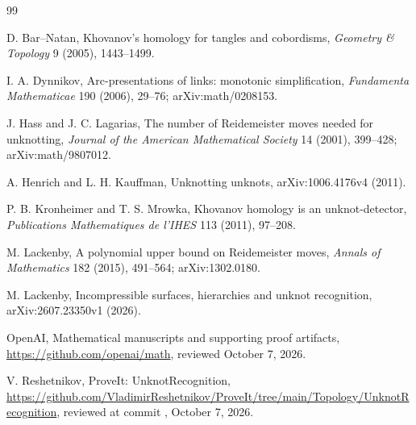 \begin{thebibliography}{99}

D. Bar--Natan,
\newblock Khovanov's homology for tangles and cobordisms,
\newblock \emph{Geometry \& Topology} 9 (2005), 1443--1499.

I. A. Dynnikov,
\newblock Arc-presentations of links: monotonic simplification,
\newblock \emph{Fundamenta Mathematicae} 190 (2006), 29--76;
\newblock arXiv:math/0208153.

J. Hass and J. C. Lagarias,
\newblock The number of Reidemeister moves needed for unknotting,
\newblock \emph{Journal of the American Mathematical Society} 14 (2001),
399--428;
\newblock arXiv:math/9807012.

A. Henrich and L. H. Kauffman,
\newblock Unknotting unknots,
\newblock arXiv:1006.4176v4 (2011).

P. B. Kronheimer and T. S. Mrowka,
\newblock Khovanov homology is an unknot-detector,
\newblock \emph{Publications Mathematiques de l'IHES} 113 (2011), 97--208.

M. Lackenby,
\newblock A polynomial upper bound on Reidemeister moves,
\newblock \emph{Annals of Mathematics} 182 (2015), 491--564;
\newblock arXiv:1302.0180.

M. Lackenby,
\newblock Incompressible surfaces, hierarchies and unknot recognition,
\newblock arXiv:2607.23350v1 (2026).

OpenAI,
\newblock Mathematical manuscripts and supporting proof artifacts,
\newblock \url{https://github.com/openai/math}, reviewed October 7, 2026.

V. Reshetnikov,
\newblock ProveIt: UnknotRecognition,
\newblock \url{https://github.com/VladimirReshetnikov/ProveIt/tree/main/Topology/UnknotRecognition},
reviewed at commit
, October 7, 2026.

\end{thebibliography}
